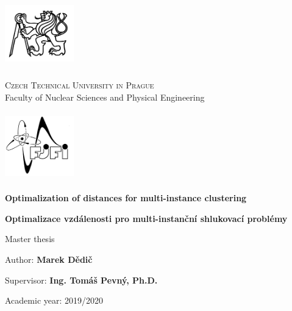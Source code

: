 \begin{center}
	\begin{minipage}{3cm}
		\includegraphics[width=3cm,height=3cm,keepaspectratio]{images/titlepage/cvut}
	\end{minipage}
	\begin{minipage}{0.6\linewidth}
		\begin{center}
			\textsc{\large Czech Technical University in Prague}\\
			{\large Faculty of Nuclear Sciences and Physical Engineering}
		\end{center}
	\end{minipage}
	\begin{minipage}{3cm}
		\includegraphics[width=3cm,height=3cm,keepaspectratio]{images/titlepage/fjfi}
	\end{minipage}

	\vspace{3.3cm}

	\textbf{\huge Optimalization of distances for multi-instance clustering}
	\vspace{1.1cm}

	\textenglish{\textbf{\huge Optimalizace vzdálenosti pro multi-instanční shlukovací problémy}}
	\vspace{1.7cm}

	{\large Master thesis}
\end{center}

\vfill

\begin{list}{}{
	\settowidth{\labelwidth}{MMMMMMMMM}
	\setlength{\leftmargin}{\labelwidth}
	\renewcommand{\makelabel}[1]{#1\hfil}}
	\item [{Author:}] \textbf{Marek Dědič}
	\item [{Supervisor:}] \textbf{Ing. Tomáš Pevný, Ph.D.}
	\item [{Academic year:}] 2019/2020
\end{list}
